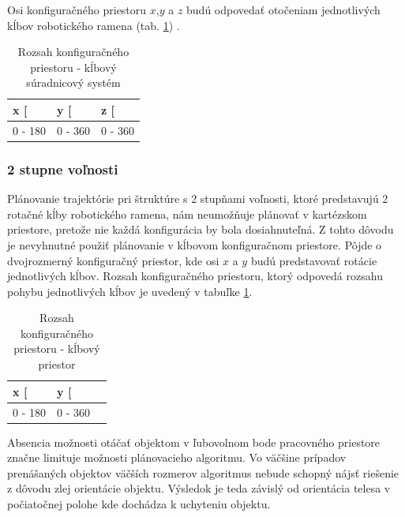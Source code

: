 Osi konfiguračného priestoru $x$,$y$ a $z$ budú odpovedať otočeniam jednotlivých kĺbov robotického ramena (tab. \ref{table 3.2}) .
\begin{table}[h]
	\centering
	\begin{tabular}{|c|c|c|}
		\hline
		\multicolumn{1}{|l|}{x {[}\degree{]}}  & \multicolumn{1}{l|}{y {[}\degree{]}} & \multicolumn{1}{l|}{z {[}\degree{]}} \\ \hline
		0 - 180                                             & 0 - 360                                             & 0 - 360                              \\ \hline
		
	\end{tabular}
	\caption{Rozsah konfiguračného priestoru - kĺbový súradnicový systém}\label{table 3.2} 
\end{table}



\subsubsection{2 stupne voľnosti}


Plánovanie trajektórie pri štruktúre s 2 stupňami voľnosti, ktoré predstavujú 2 rotačné kĺby robotického ramena, nám neumožňuje plánovať v kartézskom priestore, pretože nie každá konfigurácia by bola dosiahnuteľná. Z tohto dôvodu je nevyhnutné použiť plánovanie v kĺbovom konfiguračnom priestore. Pôjde o dvojrozmerný konfiguračný priestor, kde osi $x$ a $y$ budú predstavovať rotácie jednotlivých kĺbov. Rozsah konfiguračného priestoru, ktorý odpovedá rozsahu pohybu jednotlivých kĺbov je uvedený v tabuľke \ref{table 3.2}.

\begin{table}[h]
	\centering
	\begin{tabular}{|c|c|c|}
		\hline
		\multicolumn{1}{|l|}{x {[}\degree{]}}  & \multicolumn{1}{l|}{y {[}\degree{]}} \\ \hline
		0 - 180                                             & 0 - 360       \\ \hline
		
	\end{tabular}
	\caption{Rozsah konfiguračného priestoru - kĺbový priestor}\label{table 3.3} 
\end{table}

Absencia možnosti otáčať objektom v ľubovolnom bode pracovného priestore značne limituje možnosti plánovacieho algoritmu. Vo väčšine prípadov prenášaných objektov väčších rozmerov algoritmus nebude schopný nájsť riešenie z dôvodu zlej orientácie objektu. Výsledok je teda závislý od orientácia telesa v počiatočnej polohe kde dochádza k uchyteniu objektu. 

